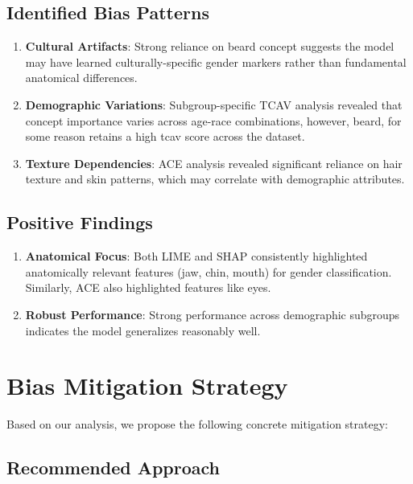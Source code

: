 \documentclass[11pt,letterpaper]{article}
\begin{document}
\subsection{Identified Bias Patterns}
\begin{enumerate}
\item \textbf{Cultural Artifacts}: Strong reliance on beard concept suggests the model may have learned culturally-specific gender markers rather than fundamental anatomical differences.

\item \textbf{Demographic Variations}: Subgroup-specific TCAV analysis revealed that concept importance varies across age-race combinations, however, beard, for some reason retains a high tcav score across the dataset.

\item \textbf{Texture Dependencies}: ACE analysis revealed significant reliance on hair texture and skin patterns, which may correlate with demographic attributes.
\end{enumerate}

\subsection{Positive Findings}
\begin{enumerate}
\item \textbf{Anatomical Focus}: Both LIME and SHAP consistently highlighted anatomically relevant features (jaw, chin, mouth) for gender classification. Similarly, ACE also highlighted features like eyes.

\item \textbf{Robust Performance}: Strong performance across demographic subgroups indicates the model generalizes reasonably well.

\end{enumerate}

\section{Bias Mitigation Strategy}

Based on our analysis, we propose the following concrete mitigation strategy:

\subsection{Recommended Approach}
\end{document}
